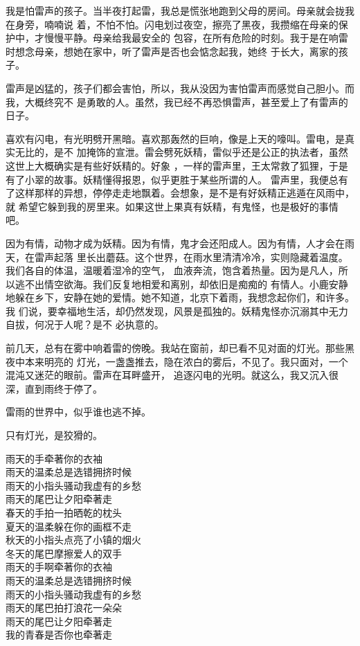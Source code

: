 \documentclass[12pt,a4paper]{article}
\begin{document}
		我是怕雷声的孩子。当半夜打起雷，我总是慌张地跑到父母的房间。母亲就会拢我在身旁，喃喃说
	着，不怕不怕。闪电划过夜空，擦亮了黑夜，我攒缩在母亲的保护中，才慢慢平静。母亲给我最安全的
	包容，在所有危险的时刻。我于是在响雷时想念母亲，想她在家中，听了雷声是否也会惦念起我，她终
	于长大，离家的孩子。


		雷声是凶猛的，孩子们都会害怕，所以，我从没因为害怕雷声而感觉自己胆小。而我，大概终究不
	是勇敢的人。虽然，我已经不再恐惧雷声，甚至爱上了有雷声的日子。


		喜欢有闪电，有光明劈开黑暗。喜欢那轰然的巨响，像是上天的嚎叫。雷电，是真实无比的，是不
	加掩饰的宣泄。雷会劈死妖精，雷似乎还是公正的执法者，虽然这世上大概确实是有些好妖精的。好象
	，一样的雷声里，王太常救了狐狸，于是有了小翠的故事。妖精懂得报恩，似乎更胜于某些所谓的人。
	雷声里，我便总有了这样那样的异想，停停走走地飘着。会想象，是不是有好妖精正逃遁在风雨中，就
	希望它躲到我的房里来。如果这世上果真有妖精，有鬼怪，也是极好的事情吧。


		因为有情，动物才成为妖精。因为有情，鬼才会还阳成人。因为有情，人才会在雨天，在雷声起落
	里长出蘑菇。这个世界，在雨水里清清冷冷，实则隐藏着温度。我们各自的体温，温暖着湿冷的空气，
	血液奔流，饱含着热量。因为是凡人，所以逃不出情空欲海。我们反复地相爱和离别，却依旧是痴痴的
	有情人。小鹿安静地躲在乡下，安静在她的爱情。她不知道，北京下着雨，我想念起你们，和许多。我
	们说，要幸福地生活，却仍然发现，风景是孤独的。妖精鬼怪亦沉溺其中无力自拔，何况于人呢？是不
	必执意的。


		前几天，总有在雾中响着雷的傍晚。我站在窗前，却已看不见对面的灯光。那些黑夜中本来明亮的
	灯光，一盏盏推去，隐在浓白的雾后，不见了。我只面对，一个混沌又迷茫的眼前。雷声在耳畔盛开，
	追逐闪电的光明。就这么，我又沉入很深，直到雨终于停了。

		雷雨的世界中，似乎谁也逃不掉。

		只有灯光，是狡猾的。

	\endwriting



		\longpoem{}{}{}
		雨天的手牵著你的衣袖 \\
		雨天的温柔总是选错拥挤时候 \\
		雨天的小指头骚动我虚有的乡愁 \\
		雨天的尾巴让夕阳牵著走 \\
		春天的手拍一拍晒乾的枕头 \\
		夏天的温柔躲在你的画框不走 \\
		秋天的小指头点亮了小镇的烟火 \\
		冬天的尾巴摩擦爱人的双手 \\
		雨天的手啊牵著你的衣袖 \\
		雨天的温柔总是选错拥挤时候 \\
		雨天的小指头骚动我虚有的乡愁 \\
		雨天的尾巴拍打浪花一朵朵 \\
		雨天的尾巴让夕阳牵著走 \\
		我的青春是否你也牵著走
		\endlongpoem
\end{document}
